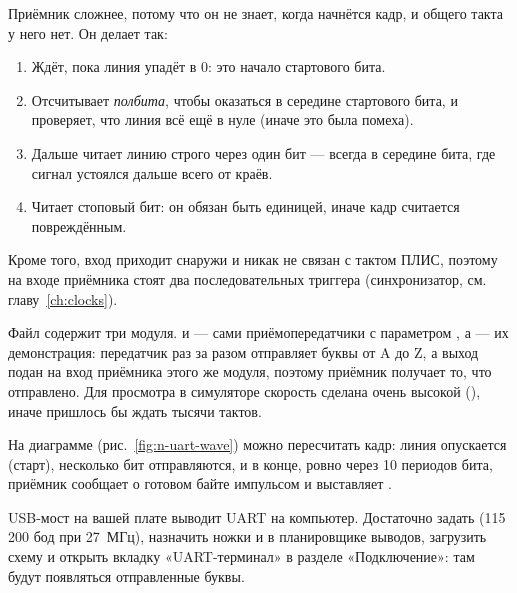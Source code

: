 Приёмник сложнее, потому что он не знает, когда начнётся кадр, и общего
такта у него нет. Он делает так:

\begin{enumerate}
  \item Ждёт, пока линия упадёт в 0: это начало стартового бита.
  \item Отсчитывает \emph{полбита}, чтобы оказаться в середине стартового бита, и
        проверяет, что линия всё ещё в нуле (иначе это была помеха).
  \item Дальше читает линию строго через один бит --- всегда в середине бита, где
        сигнал устоялся дальше всего от краёв.
  \item Читает стоповый бит: он обязан быть единицей, иначе кадр считается
        повреждённым.
\end{enumerate}

Кроме того, вход  приходит снаружи и никак не связан с тактом ПЛИС,
поэтому на входе приёмника стоят два последовательных триггера
(синхронизатор, см. главу~\ref{ch:clocks}).


Файл содержит три модуля.  и  --- сами
приёмопередатчики с параметром , а  --- их
демонстрация: передатчик раз за разом отправляет буквы от A до Z, а выход
 подан на вход приёмника этого же модуля, поэтому приёмник
получает то, что отправлено. Для просмотра в симуляторе скорость
сделана очень высокой (), иначе пришлось бы ждать
тысячи тактов.


На диаграмме (рис.~\ref{fig:n-uart-wave}) можно пересчитать кадр: линия опускается
(старт), несколько бит отправляются, и в конце, ровно через 10 периодов бита,
приёмник сообщает о готовом байте импульсом  и выставляет
.

\begin{infobox}
USB-мост на вашей плате выводит UART на компьютер. Достаточно задать
 (115\,200 бод при 27~МГц), назначить ножки  и
 в планировщике выводов, загрузить схему и открыть вкладку «UART-терминал»
в разделе «Подключение»: там будут появляться отправленные буквы.
\end{infobox}

